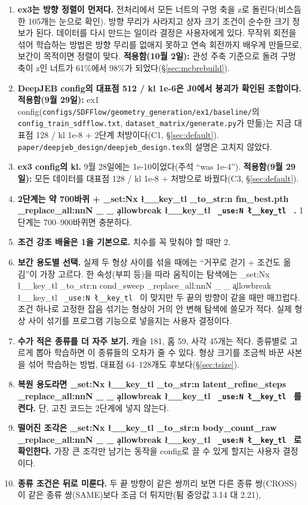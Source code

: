 \documentclass[11pt]{article}
\DeclareRobustCommand{\key}[1]{
  \tl_set:Nx \l__key_tl { \tl_to_str:n {#1} }
  \regex_replace_all:nnN { \_ } { \cO\_ \c{allowbreak} } \l__key_tl
  \texttt{ \tl_use:N \l__key_tl }
}
\begin{document}
\begin{enumerate}
\item \textbf{ex3는 방향 정렬이 먼저다.} 전처리에서 모든 너트의 구멍 축을 z로 돌린다(비스듬한 105개는 눈으로 확인). 방향 무리가 사라지고
상자 크기 조건이 순수한 크기 정보가 된다. 데이터를 다시 만드는 일이라 결정은 사용자에게 있다. 무작위 회전을 섞어 학습하는 방법은 방향 무리를
없애지 못하고 연속 회전까지 배우게 만들므로, 보간이 목적이면 정렬이 맞다.
\textbf{적용함(10월 2일):} 관성 주축 기준으로 돌려 구멍 축이 z인 너트가 61\%에서 98\%가 되었다(\S\ref{sec:mcbrebuild}).
\item \textbf{DeepJEB config의 대표점 512 / kl 1e-6은 J0에서 붕괴가 확인된 조합이다.} \textbf{적용함(9월 29일):}
ex1 config(\texttt{configs/SDFFlow/geometry\_generation/ex1/baseline/}의 \texttt{config\_train\_sdfflow.txt}, \texttt{dataset\_matrix/generate.py}가 만듦)는
지금 대표점 128 / kl 1e-8 + 2단계 처방이다(C1, \S\ref{sec:default}). \texttt{paper/deepjeb\_design/deepjeb\_design.tex}의 설명은 고치지 않았다.
\item \textbf{ex3 config의 kl.} 9월 28일에는 1e-10이었다(주석 ``was 1e-4''). \textbf{적용함(9월 29일):} 모든 데이터를 대표점 128 / kl 1e-8 + 처방으로 바꿨다(C3, \S\ref{sec:default}).
\item \textbf{2단계는 약 700바퀴 + \key{fm_best.pth}.} 1단계는 700--900바퀴면 충분하다.
\item \textbf{조건 강조 배율은 1을 기본으로.} 치수를 꼭 맞춰야 할 때만 2.
\item \textbf{보간 용도별 선택.} 실제 두 형상 사이를 섞을 때에는 ``거꾸로 걷기 + 조건도 옮김''이 가장 고르다. 한 속성(부피 등)을 따라 움직이는
탐색에는 \key{cond_sweep}이 맞지만 두 끝의 방향이 같을 때만 매끄럽다. 조건 하나로 고정한 잡음 섞기는 형상이 거의 안 변해 탐색에 쓸모가 적다.
실제 형상 사이 섞기를 프로그램 기능으로 넣을지는 사용자 결정이다.
\item \textbf{수가 적은 종류를 더 자주 보기.} 캐슬 181, 홈 59, 사각 45개는 적다. 종류별로 고르게 뽑아 학습하면 이 종류들의 오차가 줄 수 있다.
형상 크기를 조금씩 바꾼 사본을 섞어 학습하는 방법, 대표점 64--128개도 후보다(\S\ref{sec:tsize}).
\item \textbf{복원 용도라면 \key{latent_refine_steps}를 켠다.} 단, 고친 코드는 2단계에 넣지 않는다.
\item \textbf{떨어진 조각은 \key{body_count_raw}로 확인한다.} 가장 큰 조각만 남기는 동작을 config로 끌 수 있게 할지는 사용자 결정이다.
\item \textbf{종류 조건은 뒤로 미룬다.} 두 끝 방향이 같은 쌍끼리 보면 다른 종류 쌍(CROSS)이 같은 종류 쌍(SAME)보다 조금 더 튀지만(튐 중앙값 3.14 대 2.21),

\end{enumerate}
\end{document}
